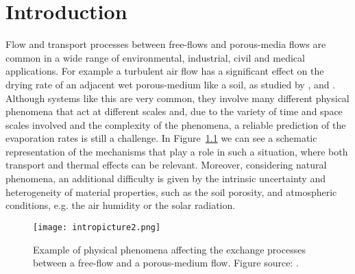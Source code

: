 \chapter{Introduction}
Flow and transport processes between free-flows and porous-media 
flows are common in a wide range of environmental, industrial, civil and medical 
applications.
For example a turbulent air flow has a significant effect on the 
drying rate of an adjacent wet porous-medium like a soil, as studied by  
\textcite{tesi:mosthaf}, \textcite{intro:davarzani} and \textcite  
{tesi:fetzer}.
Although systems like this are very common,	they involve
many different physical phenomena that act at 
different scales and,
due to the variety of time and space scales involved and the complexity of the phenomena,
a reliable prediction of the evaporation rates is still a challenge. In Figure~\ref{fig:intro} we can 
see a schematic representation of the mechanisms that play a role in such a 
situation, where both transport and thermal effects can be relevant. 
Moreover, considering natural phenomena, an additional difficulty is given by 
the intrinsic uncertainty and heterogeneity of material properties, such as the 
soil porosity, and atmospheric conditions, e.g. the air humidity or the 
solar radiation.
\begin{figure}[ht]
	\centering
	\texttt{[image: intropicture2.png]}
	\caption[Exchange processes between free and porous-medium 
	flows]{Example of physical phenomena affecting the exchange processes 
		between a free-flow and a porous-medium flow. Figure source: 
		\cite{tesi:fetzer}.}
	\label{fig:intro}
\end{figure}

